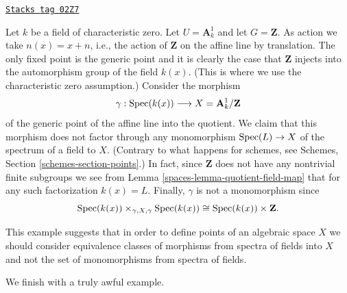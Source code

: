 \begin{example}
\label{spaces-example-affine-line-translation}
\href{https://stacks.math.columbia.edu/tag/02Z7}{\texttt{Stacks tag 02Z7}}

Let $k$ be a field of characteristic zero.
Let $U = \mathbf{A}^1_k$ and let $G = \mathbf{Z}$.
As action we take $n(x) = x + n$, i.e., the action of
$\mathbf{Z}$ on the affine line by translation.
The only fixed point is the generic point and it
is clearly the case that $\mathbf{Z}$ injects into
the automorphism group of the field $k(x)$. (This is
where we use the characteristic zero assumption.)
Consider the morphism
$$
\gamma : \operatorname{Spec}(k(x)) \longrightarrow X = \mathbf{A}^1_k/\mathbf{Z}
$$
of the generic point of the affine line into the quotient.
We claim that this morphism does not factor through any
monomorphism $\operatorname{Spec}(L) \to X$ of the spectrum of
a field to $X$. (Contrary to what happens for schemes, see
Schemes, Section \ref{schemes-section-points}.) In fact, since
$\mathbf{Z}$ does not have any nontrivial finite subgroups we see from
Lemma \ref{spaces-lemma-quotient-field-map} that for any such
factorization $k(x) = L$. Finally, $\gamma$ is not a monomorphism
since
$$
\operatorname{Spec}(k(x)) \times_{\gamma, X, \gamma} \operatorname{Spec}(k(x))
\cong
\operatorname{Spec}(k(x)) \times \mathbf{Z}.
$$
\end{example}

This example suggests that in order to define points of an algebraic space
$X$ we should consider equivalence classes of morphisms from spectra
of fields into $X$ and not the set of monomorphisms from spectra of fields.

\medskip\noindent
We finish with a truly awful example.

